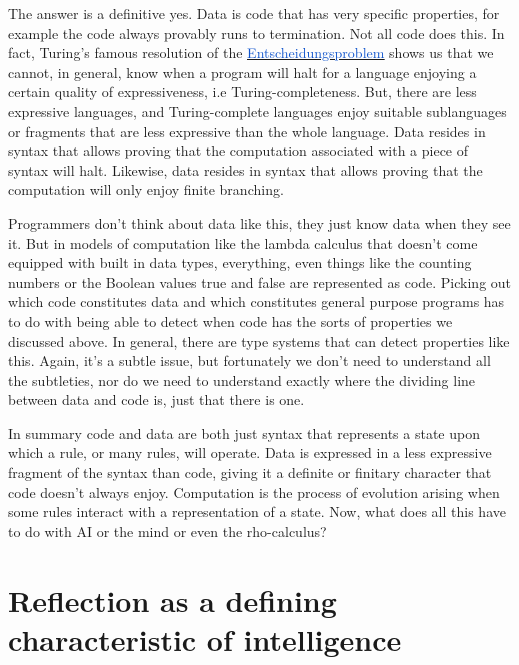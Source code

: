 \documentclass[10pt]{report}
\begin{document}
\vspace{1\baselineskip}
The answer is a definitive yes. Data is code that has very specific properties, for example the code always provably runs to termination. Not all code does this. In fact, Turing’s famous resolution of the \href{https://en.wikipedia.org/wiki/Entscheidungsproblem}{\uline{\textcolor[HTML]{1155CC}{Entscheidungsproblem}}} shows us that we cannot, in general, know when a program will halt for a language enjoying a certain quality of expressiveness, i.e Turing-completeness. But, there are less expressive languages, and Turing-complete languages enjoy suitable sublanguages or fragments that are less expressive than the whole language. Data resides in syntax that allows proving that the computation associated with a piece of syntax will halt. Likewise, data resides in syntax that allows proving that the computation will only enjoy finite branching. 

\vspace{1\baselineskip}
Programmers don’t think about data like this, they just know data when they see it. But in models of computation like the lambda calculus that doesn’t come equipped with built in data types, everything, even things like the counting numbers or the Boolean values true and false are represented as code. Picking out which code constitutes data and which constitutes general purpose programs has to do with being able to detect when code has the sorts of properties we discussed above. In general, there are type systems that can detect properties like this. Again, it’s a subtle issue, but fortunately we don’t need to understand all the subtleties, nor do we need to understand exactly where the dividing line between data and code is, just that there is one. 

\vspace{1\baselineskip}
In summary code and data are both just syntax that represents a state upon which a rule, or many rules, will operate. Data is expressed in a less expressive fragment of the syntax than code, giving it a definite or finitary character that code doesn’t always enjoy. Computation is the process of evolution arising when some rules interact with a representation of a state. Now, what does all this have to do with AI or the mind or even the rho-calculus?

\vspace{1\baselineskip}
\section{Reflection as a defining characteristic of intelligence}
\end{document}
